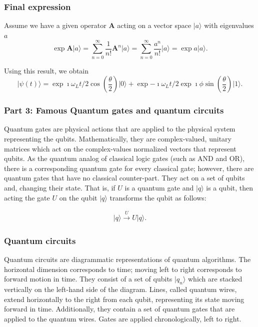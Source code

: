\documentclass{beamer}
\begin{document}
\begin{frame}
\frametitle{Final expression}

Assume we have a given operator $\bm{A}$ acting on a  vector space $\vert a\rangle$ with eigenvalues $a$ 
\[
\exp{\bm{A}}\vert a\rangle=\sum_{n=0}^{\infty} \frac{1}{n!}\bm{A}^n\vert a\rangle=\sum_{n=0}^{\infty} \frac{a^n}{n!}\vert a\rangle=\exp{a}\vert a\rangle.
\]

Using this result, we obtain
\[
\vert \psi(t) \rangle=\exp{\imath\omega_L t/2}\cos{(\frac{\theta}{2})}\vert 0\rangle +\exp{-\imath\omega_L t/2}\exp{\imath\phi}\sin{(\frac{\theta}{2})}\vert 1\rangle.
\]
\end{frame}

\begin{frame}
\frametitle{Part 3: Famous Quantum gates and quantum circuits}

Quantum gates are physical actions that are applied to the physical
system representing the qubits. Mathematically, they are
complex-valued, unitary matrices which act on the complex-values
normalized vectors that represent qubits. As the quantum analog of
classical logic gates (such as AND and OR), there is a corresponding
quantum gate for every classical gate; however, there are quantum
gates that have no classical counter-part. They act on a set of qubits
and, changing their state. That is, if $U$ is a quantum gate and
$\vert q \rangle $ is a qubit, then acting the gate $U$ on the qubit $\vert q \rangle $
transforms the qubit as follows:

\begin{align}
\vert q \rangle \overset{U}{\to}U\vert q \rangle 
.\end{align}
\end{frame}

\begin{frame}
\frametitle{Quantum circuits}

Quantum circuits are diagrammatic representations of quantum
algorithms. The horizontal dimension corresponds to time; moving left
to right corresponds to forward motion in time. They consist of a set
of qubits $\vert q_n\rangle$ which are stacked vertically on the left-hand
side of the diagram. Lines, called quantum wires, extend horizontally
to the right from each qubit, representing its state moving forward in
time. Additionally, they contain a set of quantum gates that are
applied to the quantum wires. Gates are applied chronologically, left
to right.
\end{frame}
\end{document}
